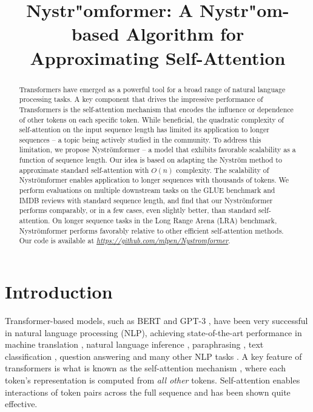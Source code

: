 \title{Nystr"{o}mformer: A Nystr"{o}m-based Algorithm for Approximating Self-Attention}

\begin{abstract}
Transformers have emerged as a powerful tool for a broad range of natural language processing tasks. A key component that drives the impressive performance of Transformers is the self-attention mechanism that encodes the influence or dependence of other tokens on each specific token. While beneficial, the quadratic complexity of self-attention on the input sequence length has limited its application to longer sequences -- a topic being actively studied in the community. To address this limitation, we propose Nystr\"{o}mformer -- a model that exhibits favorable scalability as a function of sequence length. Our idea is based on adapting the Nystr\"{o}m method to approximate  standard self-attention with $O(n)$ complexity. The scalability of Nystr\"{o}mformer enables application to longer sequences with thousands of tokens. We perform evaluations on multiple downstream tasks on the GLUE benchmark and IMDB reviews with standard sequence length, and find that our Nystr\"{o}mformer performs comparably, or in a few cases, even slightly better, than standard self-attention. On longer sequence tasks in the Long Range Arena (LRA) benchmark, Nystr\"{o}mformer performs favorably relative to other efficient self-attention methods. Our code is available at  \textit{\url{https://github.com/mlpen/Nystromformer}}.
\end{abstract}

\section{Introduction}

Transformer-based models, such as BERT \cite{devlin2019bert} and GPT-3 \cite{brown2020language}, have been very successful in natural language processing (NLP), achieving state-of-the-art performance in machine translation \cite{vaswani2017attention}, natural language inference \cite{williams2018broad}, paraphrasing \cite{dolan2005automatically}, text classification \cite{howard2018universal}, question answering \cite{rajpurkar2016squad} and many other NLP tasks \cite{peters2018deep,radford2018improving}. A key feature of transformers is what is known as the self-attention mechanism \cite{vaswani2017attention}, where each token’s representation is computed from {\it all other} tokens. Self-attention enables interactions of token pairs across the full sequence and has been shown quite effective. 

